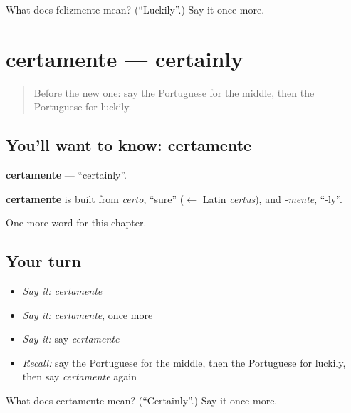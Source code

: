 \begin{tcolorbox}[breakable,colback=teal!4,colframe=teal!35!black,title={Before you move on}]
What does felizmente mean? (\textquotedblleft{}Luckily\textquotedblright{}.) Say it once more.
\end{tcolorbox}
\section[certamente]{certamente — certainly}

\label{lesson:PT-C184-certamente}



\begin{quote}
Before the new one: say the Portuguese for the middle, then the Portuguese for luckily.
\end{quote}

\subsection*{You'll want to know: certamente}
\textbf{certamente} — \textquotedblleft{}certainly\textquotedblright{}.

\begin{cousinweb}
\textbf{certamente} is built from \emph{certo}, \textquotedblleft{}sure\textquotedblright{} ($\leftarrow$ Latin \emph{certus}), and \emph{-mente}, \textquotedblleft{}-ly\textquotedblright{}.
\end{cousinweb}

\begin{grammarlens}[title={What you've built}]
One more word for this chapter.
\end{grammarlens}

\subsection*{Your turn}
\begin{itemize}
\raggedright
  \item \emph{Say it:} \emph{certamente}
  \item \emph{Say it:} \emph{certamente}, once more
  \item \emph{Say it:} say \emph{certamente}
  \item \emph{Recall:} say the Portuguese for the middle, then the Portuguese for luckily, then say \emph{certamente} again
\end{itemize}

\begin{tcolorbox}[breakable,colback=teal!4,colframe=teal!35!black,title={Before you move on}]
What does certamente mean? (\textquotedblleft{}Certainly\textquotedblright{}.) Say it once more.
\end{tcolorbox}
